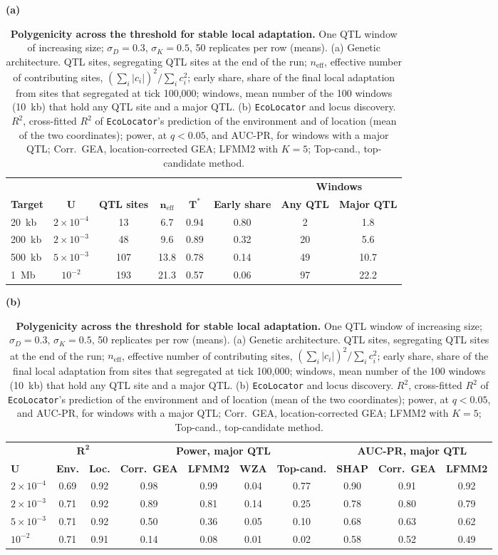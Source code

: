 \documentclass[]{article}
\newcommand{\ecolocator}{\texttt{EcoLocator}\xspace}
\begin{document}
\begin{table}[ht]
  \centering
  \caption{\textbf{Polygenicity across the threshold for stable local adaptation.}
  One QTL window of increasing size;
  $\sigma_D = 0.3$, $\sigma_K = 0.5$, 50 replicates per row (means).
  (a) Genetic architecture.
  QTL sites, segregating QTL sites at the end of the run;
  $n_{\mathrm{eff}}$, effective number of contributing sites,
  $(\sum_i |c_i|)^2 / \sum_i c_i^2$;
  early share, share of the final local adaptation
  from sites that segregated at tick 100,000;
  windows, mean number of the 100 windows (10~kb)
  that hold any QTL site and a major QTL.
  (b) \ecolocator and locus discovery.
  $R^2$, cross-fitted $R^2$ of \ecolocator's prediction
  of the environment and of location (mean of the two coordinates);
  power, at $q < 0.05$, and AUC-PR, for windows with a major QTL;
  Corr.\ GEA, location-corrected GEA;
  LFMM2 with $K = 5$;
  Top-cand., top-candidate method.}
  \label{tab:polygenicity}
  \small
  \setlength{\tabcolsep}{4pt}
  \textbf{(a)}\par\smallskip
  \begin{tabular}{@{}lccccccc@{}}
  \hline
  & & & & & & \multicolumn{2}{c}{\textbf{Windows}} \\
  \textbf{Target} & $\boldsymbol{U}$ & \textbf{QTL sites} & $\boldsymbol{n_{\mathrm{eff}}}$ & $\boldsymbol{T^*}$ & \textbf{Early share} & \textbf{Any QTL} & \textbf{Major QTL} \\
  \hline
  20~kb  & $2 \times 10^{-4}$ & 13  & 6.7  & 0.94 & 0.80 & 2  & 1.8 \\
  200~kb & $2 \times 10^{-3}$ & 48  & 9.6  & 0.89 & 0.32 & 20 & 5.6 \\
  500~kb & $5 \times 10^{-3}$ & 107 & 13.8 & 0.78 & 0.14 & 49 & 10.7 \\
  1~Mb   & $10^{-2}$          & 193 & 21.3 & 0.57 & 0.06 & 97 & 22.2 \\
  \hline
  \end{tabular}

  \bigskip
  \textbf{(b)}\par\smallskip
  \setlength{\tabcolsep}{3.5pt}
  \begin{tabular}{@{}lccccccccc@{}}
  \hline
  & \multicolumn{2}{c}{$\boldsymbol{R^2}$} & \multicolumn{4}{c}{\textbf{Power, major QTL}} & \multicolumn{3}{c}{\textbf{AUC-PR, major QTL}} \\
  $\boldsymbol{U}$ & \textbf{Env.} & \textbf{Loc.} & \textbf{Corr.\ GEA} & \textbf{LFMM2} & \textbf{WZA} & \textbf{Top-cand.} & \textbf{SHAP} & \textbf{Corr.\ GEA} & \textbf{LFMM2} \\
  \hline
  $2 \times 10^{-4}$ & 0.69 & 0.92 & 0.98 & 0.99 & 0.04 & 0.77 & 0.90 & 0.91 & 0.92 \\
  $2 \times 10^{-3}$ & 0.71 & 0.92 & 0.89 & 0.81 & 0.14 & 0.25 & 0.78 & 0.80 & 0.79 \\
  $5 \times 10^{-3}$ & 0.71 & 0.92 & 0.50 & 0.36 & 0.05 & 0.10 & 0.68 & 0.63 & 0.62 \\
  $10^{-2}$          & 0.71 & 0.91 & 0.14 & 0.08 & 0.01 & 0.02 & 0.58 & 0.52 & 0.49 \\
  \hline
  \end{tabular}
\end{table}
\end{document}
